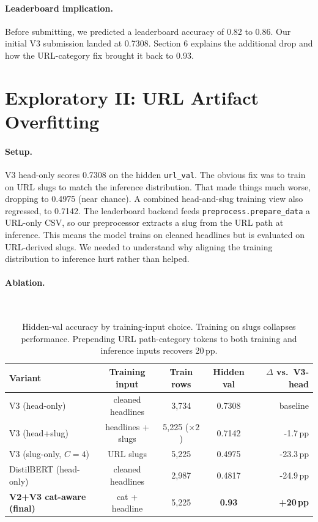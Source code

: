\documentclass[11pt]{article}
\begin{document}
\paragraph{Leaderboard implication.}
Before submitting, we predicted a leaderboard accuracy of 0.82 to 0.86. Our initial V3 submission landed at 0.7308. Section 6 explains the additional drop and how the URL-category fix brought it back to 0.93.

\section{Exploratory II: URL Artifact Overfitting}
\paragraph{Setup.}
V3 head-only scores 0.7308 on the hidden \texttt{url\_val}. The obvious fix was to train on URL slugs to match the inference distribution. That made things much worse, dropping to 0.4975 (near chance). A combined head-and-slug training view also regressed, to 0.7142. The leaderboard backend feeds \texttt{preprocess.prepare\_data} a URL-only CSV, so our preprocessor extracts a slug from the URL path at inference. This means the model trains on cleaned headlines but is evaluated on URL-derived slugs. We needed to understand why aligning the training distribution to inference hurt rather than helped.

\paragraph{Ablation.}\mbox{}\\[-4em]
\begin{table}[H]
\centering\footnotesize
\setlength{\tabcolsep}{4pt}
\begin{tabular}{lcccr}
\toprule
Variant & Training input & Train rows & Hidden val & $\Delta$ vs.\ V3-head \\\midrule
V3 (head-only)              & cleaned headlines    & 3{,}734            & 0.7308 & baseline \\
V3 (head+slug)              & headlines + slugs    & 5{,}225 ($\times 2$) & 0.7142 & -1.7\,pp \\
V3 (slug-only, $C{=}4$)     & URL slugs            & 5{,}225            & 0.4975 & -23.3\,pp \\
DistilBERT (head-only)      & cleaned headlines    & 2{,}987            & 0.4817 & -24.9\,pp \\\midrule
\textbf{V2+V3 cat-aware (final)} & cat + headline  & 5{,}225            & \textbf{0.93} & \textbf{+20\,pp} \\
\bottomrule
\end{tabular}
\caption{Hidden-val accuracy by training-input choice. Training on slugs collapses performance. Prepending URL path-category tokens to both training and inference inputs recovers 20\,pp.}
\label{tab:ablation}
\end{table}
\end{document}

